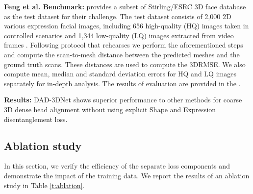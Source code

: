\documentclass[10pt,twocolumn,letterpaper]{article}
\begin{document}
\textbf{Feng et al. Benchmark:} \cite{3d-face-modeling-from-diverse-raw-scan-data} provides a subset of Stirling/ESRC 3D face database as the test dataset for their challenge. The test dataset consists of 2,000 2D various expression facial images, including 656 high-quality (HQ) images taken in controlled scenarios and 1,344 low-quality (LQ) images extracted from video frames \cite{Stirling}. Following \cite{3d-face-modeling-from-diverse-raw-scan-data} protocol that rehearses \cite{RingNet} we perform the aforementioned steps and  compute the scan-to-mesh distance between the predicted meshes and the ground truth scans. These distances are used to compute the 3DRMSE. We also compute mean, median and standard deviation errors for HQ and LQ images separately for in-depth analysis. The results of evaluation are provided in the .

\textbf{Results:} DAD-3DNet shows superior performance to other methods for coarse 3D dense head alignment without using explicit Shape and Expression disentanglement loss. 






\subsection{Ablation study}
\label{ssec:ablation}



In this section, we verify the efficiency of the separate loss components and demonstrate the impact of the training data. We report the results of an ablation study in Table \ref{t:ablation}. 
\end{document}
